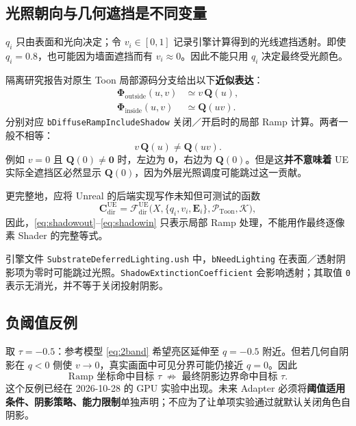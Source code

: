 \documentclass[UTF8,11pt,a4paper]{ctexart}
\newcommand{\sue}{\mathrm{UE}}
\numberwithin{equation}{section}
\begin{document}
\subsection{光照朝向与几何遮挡是不同变量}
$q_i$ 只由表面和光向决定；令 $v_i\in[0,1]$ 记录引擎计算得到的光线遮挡透射。即使 $q_i=0.8$，也可能因为墙面遮挡而有 $v_i\approx0$。因此不能只用 $q_i$ 决定最终受光颜色。

隔离研究报告对原生 Toon 局部源码分支给出以下\textbf{近似表达}：
\begin{align}
\boldsymbol\Phi_{\mathrm{outside}}(u,v)
&\simeq v\,\mathbf Q(u),\label{eq:shadowout}\\
\boldsymbol\Phi_{\mathrm{inside}}(u,v)
&\simeq\mathbf Q(uv).\label{eq:shadowin}
\end{align}
分别对应 \texttt{bDiffuseRampIncludeShadow} 关闭／开启时的局部 Ramp 计算。两者一般不相等：
\begin{equation}
v\,\mathbf Q(u)\ne\mathbf Q(uv).
\end{equation}
例如 $v=0$ 且 $\mathbf Q(0)\ne\mathbf0$ 时，左边为 $\mathbf0$，右边为 $\mathbf Q(0)$。但是这\textbf{并不意味着} UE 实际全遮挡区必然显示 $\mathbf Q(0)$，因为外层光照调度可能跳过这一贡献。

更完整地，应将 Unreal 的后端实现写作未知但可测试的函数
\begin{equation}
\mathbf C^{\sue}_{\mathrm{dir}}=
\mathcal F_{\mathrm{dir}}^{\sue}\bigl(X,\{q_i,v_i,\mathbf E_i\},\mathcal P_{\mathrm{Toon}},\mathcal K\bigr),
\label{eq:uenative}
\end{equation}
因此，\eqref{eq:shadowout}--\eqref{eq:shadowin} 只表示局部 Ramp 处理，不能用作最终逐像素 Shader 的完整等式。

引擎文件 \texttt{SubstrateDeferred}\allowbreak\texttt{Lighting.ush} 中，\texttt{bNeedLighting} 在表面／透射阴影项为零时可能跳过光照。\texttt{ShadowExtinction}\allowbreak\texttt{Coefficient} 会影响透射；其取值 \texttt{0} 表示无消光，并不等于关闭投射阴影。

\subsection{负阈值反例}
取 $\tau=-0.5$：参考模型 \eqref{eq:2band} 希望亮区延伸至 $q=-0.5$ 附近。但若几何自阴影在 $q<0$ 侧使 $v\to0$，真实画面中可见分界可能仍接近 $q=0$。因此
\begin{equation}
\boxed{\text{Ramp 坐标命中目标 }\tau\;\not\Rightarrow\;
\text{最终阴影边界命中目标 }\tau.}
\end{equation}
这个反例已经在 2026-10-28 的 GPU 实验中出现。未来 Adapter 必须将\textbf{阈值适用条件、阴影策略、能力限制}单独声明；不应为了让单项实验通过就默认关闭角色自阴影。
\end{document}
